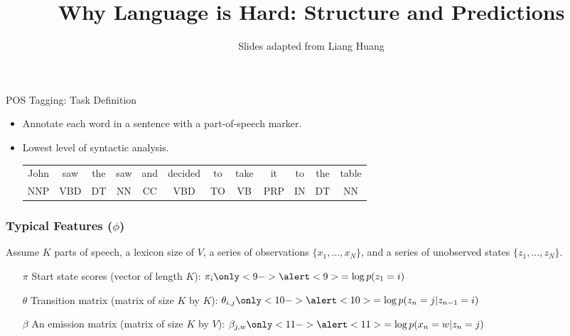 \documentclass[compress]{beamer}
\title{Why Language is Hard: Structure and Predictions}
\date{Slides adapted from Liang Huang}
\begin{document}
\frame{
\titlepage
}


\begin{frame}{POS Tagging: Task Definition}

\begin{itemize}
\item Annotate each word in a sentence with a part-of-speech marker.
\item Lowest level of syntactic analysis.

\begin{scriptsize}
\begin{tabular}{cccccccccccc}
John  & saw &  the &  saw &  and & decided & to & take & it &    to &  the  & table \\
NNP & VBD & DT & NN & CC & VBD  &   TO &VB & PRP &IN &DT  &  NN
\end{tabular}
\end{scriptsize}
\end{itemize}
\end{frame}



\begin{frame}
\frametitle{Typical Features ($\phi$)}

Assume $K$ parts of speech, a lexicon size of $V$, a series of observations $\{x_1, \dots, x_N\}$, and a series of unobserved states $\{z_1, \dots, z_N\}$.

\begin{itemize}
  \item[$\pi$] Start state scores (vector of length $K$):
    $\pi_i\popshow{9}{ = \log p(z_1 = i)}$
  \item[$\theta$] Transition matrix (matrix of size $K$ by $K$):
    $\theta_{i,j}\popshow{10}{ = \log p(z_{n} = j | z_{n-1} = i)}$
  \item[$\beta$] An emission matrix (matrix of size $K$ by $V$): $\beta_{j,w} \popshow{11}{ = \log  p(x_n = w | z_n=j)}$
\end{itemize}



\end{frame}
\end{document}
